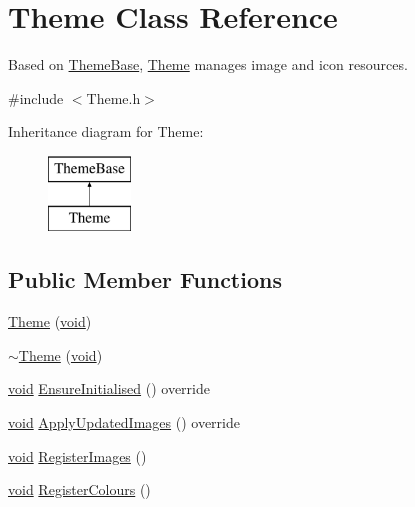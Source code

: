 \hypertarget{class_theme}{}\section{Theme Class Reference}
\label{class_theme}


Based on \hyperlink{class_theme_base}{Theme\+Base}, \hyperlink{class_theme}{Theme} manages image and icon resources.  




{\ttfamily \#include $<$Theme.\+h$>$}

Inheritance diagram for Theme\+:\begin{figure}[H]
\begin{center}
\leavevmode
\includegraphics[height=2.000000cm]{class_theme}
\end{center}
\end{figure}
\subsection*{Public Member Functions}
\begin{DoxyCompactItemize}
\item 
\hyperlink{class_theme_a8cb969ac130c232c64dc85aad6f80b1e}{Theme} (\hyperlink{sound_8c_ae35f5844602719cf66324f4de2a658b3}{void})
\item 
\hyperlink{class_theme_a8edfbae63fd06911cd6b5db90b67311d}{$\sim$\+Theme} (\hyperlink{sound_8c_ae35f5844602719cf66324f4de2a658b3}{void})
\item 
\hyperlink{sound_8c_ae35f5844602719cf66324f4de2a658b3}{void} \hyperlink{class_theme_a607ec13b1d2f75c3ca09e78853db8c7b}{Ensure\+Initialised} () override
\item 
\hyperlink{sound_8c_ae35f5844602719cf66324f4de2a658b3}{void} \hyperlink{class_theme_a5e042bcadcb5b2a66e5344f591aab338}{Apply\+Updated\+Images} () override
\item 
\hyperlink{sound_8c_ae35f5844602719cf66324f4de2a658b3}{void} \hyperlink{class_theme_a08619cf052afe509f967384725652f68}{Register\+Images} ()
\item 
\hyperlink{sound_8c_ae35f5844602719cf66324f4de2a658b3}{void} \hyperlink{class_theme_ab01e43bcb213aac20c552ddeb2c6d6e6}{Register\+Colours} ()
\end{DoxyCompactItemize}

